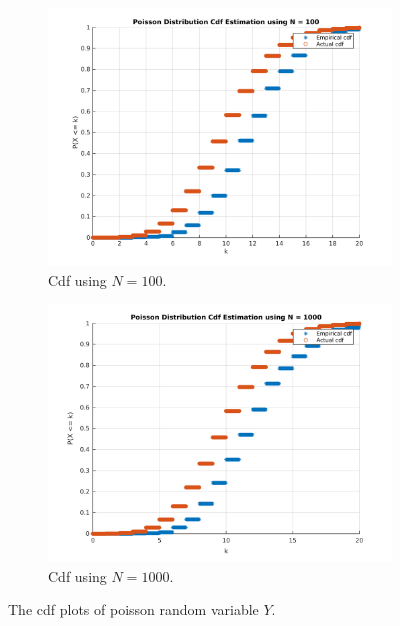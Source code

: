 \documentclass{article}
\begin{document}
	\pagebreak

		\begin{figure}[!hbt]
			\centering
			\begin{subfigure}[!hbt]{0.45\linewidth}
				\centering
				\includegraphics[width=1\linewidth]{hw2_8_poi_n100.png}
				\caption{Cdf using $N = 100$.}
			\end{subfigure}
			\begin{subfigure}[!hbt]{0.45\linewidth}
				\centering
				\includegraphics[width=1\linewidth]{hw2_8_poi_n1000.png}
				\caption{Cdf using $N = 1000$.}
			\end{subfigure}
			\caption{The cdf plots of poisson random variable $Y$.}
		\end{figure}
\end{document}
